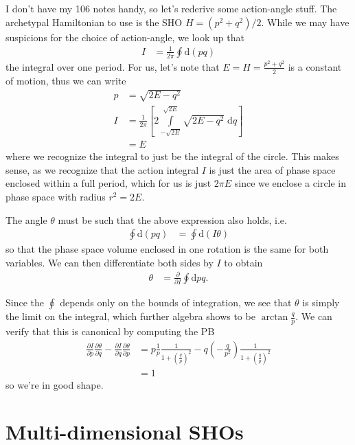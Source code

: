 \documentclass[12pt]{report}
\newcommand{\pd}[2]{\frac{\partial#1}{\partial#2}}
\begin{document}
I don't have my 106 notes handy, so let's rederive some action-angle stuff. The
archetypal Hamiltonian to use is the SHO $H = (p^2 + q^2)/2$. While we may have
suspicions for the choice of action-angle, we look up that
\begin{align}
    I &= \frac{1}{2\pi}\oint \mathrm{d}(pq)
\end{align}
the integral over one period. For us, let's note that
$E = H = \frac{p^2 + q^2}{2}$
is a constant of motion, thus we can write
\begin{align}
    p &= \sqrt{2E - q^2}\\
    I &= \frac{1}{2\pi} \left[ 2 \int\limits_{-\sqrt{2E}}^{\sqrt{2E}}
        \sqrt{2E - q^2}\;\mathrm{d}q \right]\\
    &= E
\end{align}
where we recognize the integral to just be the integral of the circle. This
makes sense, as we recognize that the action integral $I$ is just the area of
phase space enclosed within a full period, which for us is just $2\pi E$ since
we enclose a circle in phase space with radius $r^2 = 2E$.

The angle $\theta$ must be such that the above expression also holds, i.e.
\begin{align}
    \oint \mathrm{d}(pq) &= \oint \mathrm{d}(I\theta)
\end{align}
so that the phase space volume enclosed in one rotation is the same for both
variables. We can then differentiate both sides by $I$ to obtain
\begin{align}
    \theta &= \pd{}{I}\oint \mathrm{d}pq.
\end{align}

Since the $\oint$ depends only on the bounds of integration, we see that
$\theta$ is simply the limit on the integral, which further algebra shows to be
$\arctan \frac{q}{p}$. We can verify that this is canonical by computing the PB
\begin{align}
    \pd{I}{p}\pd{\theta}{q} - \pd{I}{q}\pd{\theta}{p} &=
        p \frac{1}{p}\frac{1}{1 + \left( \frac{q}{p} \right)^2} -
        q \left( - \frac{q}{p^2} \right)
        \frac{1}{1 + \left( \frac{q}{p} \right)^2}\\
    &= 1
\end{align}
so we're in good shape.

\section{Multi-dimensional SHOs}
\end{document}
